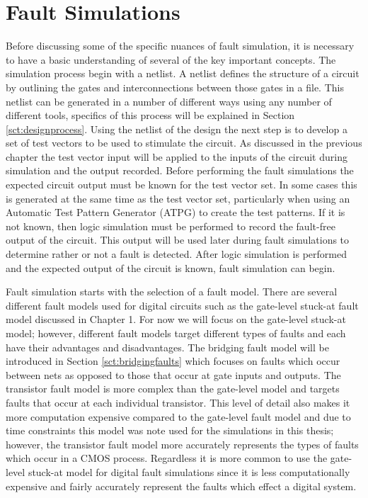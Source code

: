 \documentclass[12pt]{report}
\begin{document}
\section{Fault Simulations}
Before discussing some of the specific nuances of fault simulation, it is necessary to have a basic understanding of several of the key important concepts.  The simulation process begin with a netlist.  A netlist defines the structure of a circuit by outlining the gates and interconnections between those gates in a file\cite{needed}.  This netlist can be generated in a number of different ways using any number of different tools, specifics of this process will be explained in Section \ref{sct:designprocess}.  Using the netlist of the design the next step is to develop a set of test vectors to be used to stimulate the circuit.  As discussed in the previous chapter the test vector input will be applied to the inputs of the circuit during simulation and the output recorded.  Before performing the fault simulations the expected circuit output must be known for the test vector set.  In some cases this is generated at the same time as the test vector set, particularly when using an Automatic Test Pattern Generator (ATPG) to create the test patterns.  If it is not known, then logic simulation must be performed to record the fault-free output of the circuit.  This output will be used later during fault simulations to determine rather or not a fault is detected.  After logic simulation is performed and the expected output of the circuit is known, fault simulation can begin.

Fault simulation starts with the selection of a fault model.  There are several different fault models used for digital circuits such as the gate-level stuck-at fault model discussed in Chapter 1.  For now we will focus on the gate-level stuck-at model; however, different fault models target different types of faults and each have their advantages and disadvantages.  The bridging fault model will be introduced in Section \ref{sct:bridgingfaults} which focuses on faults which occur between nets as opposed to those that occur at gate inputs and outputs\cite{needed}.  The transistor fault model is more complex than the gate-level model and targets faults that occur at each individual transistor.  This level of detail also makes it more computation expensive compared to the gate-level fault model and due to time constraints this model was note used for the simulations in this thesis; however, the transistor fault model more accurately represents the types of faults which occur in a CMOS process\cite{needed}.  Regardless it is more common to use the gate-level stuck-at model for digital fault simulations since it is less computationally expensive and fairly accurately represent the faults which effect a digital system\cite{needed}.  
\end{document}
